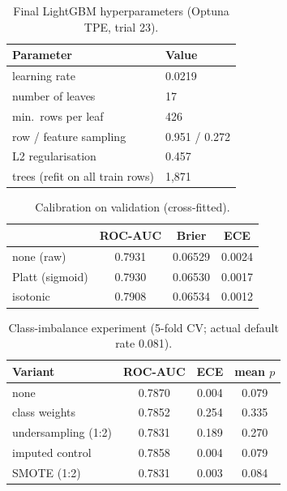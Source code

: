 \documentclass[conference,10pt]{IEEEtran}
\begin{document}
\begin{table}[!ht]
\centering\small
\caption{Final LightGBM hyperparameters (Optuna TPE, trial 23).}
\begin{tabular}{@{}ll@{}}
\toprule
Parameter & Value \\
\midrule
learning rate & 0.0219 \\
number of leaves & 17 \\
min.\ rows per leaf & 426 \\
row / feature sampling & 0.951 / 0.272 \\
L2 regularisation & 0.457 \\
trees (refit on all train rows) & 1,871 \\
\bottomrule
\end{tabular}
\end{table}

\begin{table}[!ht]
\centering\small
\caption{Calibration on validation (cross-fitted).}
\begin{tabular}{@{}lccc@{}}
\toprule
 & ROC-AUC & Brier & ECE \\
\midrule
none (raw) & 0.7931 & 0.06529 & 0.0024 \\
Platt (sigmoid) & 0.7930 & 0.06530 & 0.0017 \\
isotonic & 0.7908 & 0.06534 & 0.0012 \\
\bottomrule
\end{tabular}
\end{table}

\begin{table}[!ht]
\centering\small
\caption{Class-imbalance experiment (5-fold CV; actual default rate 0.081).}
\label{tab:imbalance}
\setlength{\tabcolsep}{3pt}
\begin{tabular}{@{}lccc@{}}
\toprule
Variant & ROC-AUC & ECE & mean $p$ \\
\midrule
none & 0.7870 & 0.004 & 0.079 \\
class weights & 0.7852 & 0.254 & 0.335 \\
undersampling (1:2) & 0.7831 & 0.189 & 0.270 \\
imputed control & 0.7858 & 0.004 & 0.079 \\
SMOTE (1:2) & 0.7831 & 0.003 & 0.084 \\
\bottomrule
\end{tabular}
\end{table}
\end{document}
